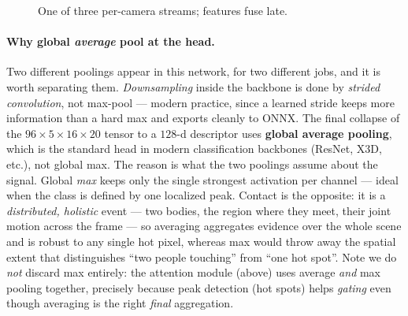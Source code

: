 \documentclass[11pt]{article}
\begin{document}
\begin{figure}[h]\centering
{}
\caption{One of three per-camera streams; features fuse late.}
\end{figure}

\paragraph{Why global \emph{average} pool at the head.}
Two different poolings appear in this network, for two different jobs, and
it is worth separating them. \emph{Downsampling} inside the backbone is
done by \emph{strided convolution}, not max-pool --- modern practice, since
a learned stride keeps more information than a hard max and exports cleanly
to ONNX. The final collapse of the $96\times5\times16\times20$ tensor to a
$128$-d descriptor uses \textbf{global average pooling}, which is the
standard head in modern classification backbones (ResNet, X3D, etc.), not
global max. The reason is what the two poolings assume about the signal.
Global \emph{max} keeps only the single strongest activation per channel ---
ideal when the class is defined by one localized peak. Contact is the
opposite: it is a \emph{distributed, holistic} event --- two bodies, the
region where they meet, their joint motion across the frame --- so averaging
aggregates evidence over the whole scene and is robust to any single hot
pixel, whereas max would throw away the spatial extent that distinguishes
``two people touching'' from ``one hot spot''. Note we do \emph{not}
discard max entirely: the attention module (above) uses average \emph{and}
max pooling together, precisely because peak detection (hot spots) helps
\emph{gating} even though averaging is the right \emph{final} aggregation.
\end{document}
